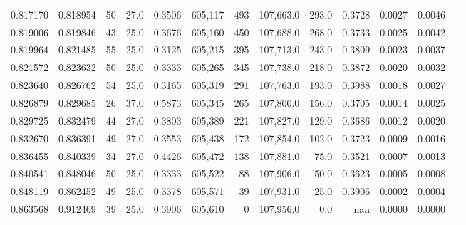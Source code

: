 \begin{tabular}{rrrrrrrrrrrrr}
0.817170 & 0.818954 &    50 & 27.0 &                                     0.3506 & 605,117 &     493 & 107,663.0 &     293.0 & 0.3728 & 0.0027 & 0.0046 \\
0.819006 & 0.819846 &    43 & 25.0 &                                     0.3676 & 605,160 &     450 & 107,688.0 &     268.0 & 0.3733 & 0.0025 & 0.0042 \\
0.819964 & 0.821485 &    55 & 25.0 &                                     0.3125 & 605,215 &     395 & 107,713.0 &     243.0 & 0.3809 & 0.0023 & 0.0037 \\
0.821572 & 0.823632 &    50 & 25.0 &                                     0.3333 & 605,265 &     345 & 107,738.0 &     218.0 & 0.3872 & 0.0020 & 0.0032 \\
0.823640 & 0.826762 &    54 & 25.0 &                                     0.3165 & 605,319 &     291 & 107,763.0 &     193.0 & 0.3988 & 0.0018 & 0.0027 \\
0.826879 & 0.829685 &    26 & 37.0 &                                     0.5873 & 605,345 &     265 & 107,800.0 &     156.0 & 0.3705 & 0.0014 & 0.0025 \\
0.829725 & 0.832479 &    44 & 27.0 &                                     0.3803 & 605,389 &     221 & 107,827.0 &     129.0 & 0.3686 & 0.0012 & 0.0020 \\
0.832670 & 0.836391 &    49 & 27.0 &                                     0.3553 & 605,438 &     172 & 107,854.0 &     102.0 & 0.3723 & 0.0009 & 0.0016 \\
0.836455 & 0.840339 &    34 & 27.0 &                                     0.4426 & 605,472 &     138 & 107,881.0 &      75.0 & 0.3521 & 0.0007 & 0.0013 \\
0.840541 & 0.848046 &    50 & 25.0 &                                     0.3333 & 605,522 &      88 & 107,906.0 &      50.0 & 0.3623 & 0.0005 & 0.0008 \\
0.848119 & 0.862452 &    49 & 25.0 &                                     0.3378 & 605,571 &      39 & 107,931.0 &      25.0 & 0.3906 & 0.0002 & 0.0004 \\
0.863568 & 0.912469 &    39 & 25.0 &                                     0.3906 & 605,610 &       0 & 107,956.0 &       0.0 &    nan & 0.0000 & 0.0000 \\
\bottomrule
\end{tabular}
